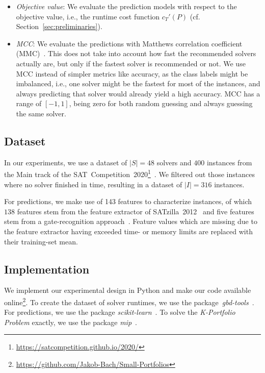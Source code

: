 \documentclass[conference]{IEEEtran}
\begin{document}
\begin{itemize}
	\item \emph{Objective value}:
	We evaluate the prediction models with respect to the objective value, i.e., the runtime cost function $c_{T}'(P)$ (cf. Section~\ref{sec:preliminaries}). 
	\item \emph{MCC}:
	We evaluate the predictions with Matthews correlation coefficient (MMC)~\cite{matthews1975comparison, gorodkin2004comparing}.
	This does not take into account how fast the recommended solvers actually are, but only if the fastest solver is recommended or not.
	We use MCC instead of simpler metrics like accuracy, as the class labels might be imbalanced, i.e., one solver might be the fastest for most of the instances, and always predicting that solver would already yield a high accuracy.
	MCC has a range of $[-1,1]$, being zero for both random guessing and always guessing the same solver.
\end{itemize}

\subsection{Dataset}

In our experiments, we use a dataset of $|S| = 48$ solvers and $400$ instances from the Main track of the SAT~Competition~2020\footnote{\url{https://satcompetition.github.io/2020/}}~\cite{balyo2020proceedings, SC2020:AIJ}. 
We filtered out those instances where no solver finished in time, resulting in a dataset of $|I| = 316$ instances. 

For predictions, we make use of 143 features to characterize instances, of which 
$138$ features stem from the feature extractor of SATzilla~2012~\cite{xu2008satzilla, xu2012satzilla2012} and five features stem from a gate-recognition approach~\cite{Iser:2015:GateRecognition}. 
Feature values which are missing due to the feature extractor having exceeded time- or memory limits are replaced with their training-set mean. 

\subsection{Implementation}

We implement our experimental design in Python and make our code available online\footnote{\url{https://github.com/Jakob-Bach/Small-Portfolios}}.
To create the dataset of solver runtimes, we use the package~\emph{gbd-tools}~\cite{iser2020collaborative}.
For predictions, we use the package \emph{scikit-learn}~\cite{scikit-learn}.
To solve the \emph{K-Portfolio Problem} exactly, we use the package \emph{mip}~\cite{python-mip}.
\end{document}
